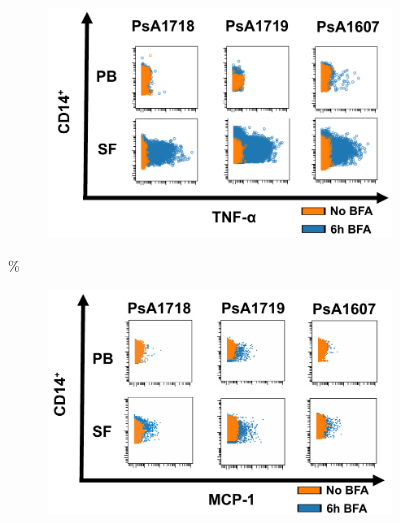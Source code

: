 \bigskip
\begin{figure}[H]
\centering
\begin{subfigure}[b]{0.45\textwidth}
\centering 
\includegraphics[width=\textwidth]{./Results3/pdfs/PSA_0h_6h_BFA_TNFa_mass_cytometry_PSA1718_PSA1719_PSA1607}
\caption{}
\end{subfigure}\%
~
\begin{subfigure}[b]{0.45\textwidth} 
\centering
\includegraphics[width=\textwidth]{./Results3/pdfs/PSA_0h_6h_BFA_MCP1_mass_cytometry_PSA1718_PSA1719_PSA1607}
\caption{}
\end{subfigure}
\begin{subfigure}[b]{0.45\textwidth} 
\centering

\end{subfigure}
\end{figure}
